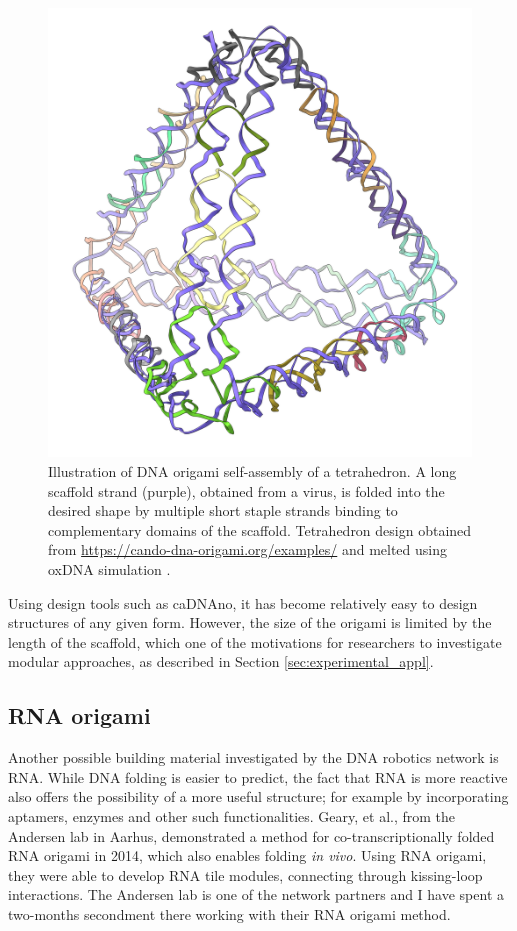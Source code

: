 \begin{figure}
    \centering\includegraphics[width=\textwidth/3]{figures/melt/assembled.png}
    \caption{Illustration of DNA origami self-assembly of a tetrahedron. A long scaffold strand (purple), obtained from a virus, is folded into the desired shape by multiple short staple strands binding to complementary domains of the scaffold. Tetrahedron design obtained from \url{https://cando-dna-origami.org/examples/} and melted using oxDNA simulation \cite{ouldridge2010dna}.
    }
    \label{fig:dnaOrigami}
\end{figure}

Using design tools such as caDNAno\cite{douglas2009rapid}, it has become relatively easy to design structures of any given form. However, the size of the origami is limited by the length of the scaffold, which one of the motivations for researchers to investigate modular approaches, as described in Section \ref{sec:experimental_appl}.

\subsection{RNA origami}

Another possible building material investigated by the DNA robotics network is RNA. While DNA folding is easier to predict, the fact that RNA is more reactive also offers the possibility of a more useful structure; for example by incorporating aptamers, enzymes and other such functionalities\cite{guo2010emerging}.
Geary, et al., from the Andersen lab in Aarhus, demonstrated a method\cite{geary2014single, sparvath2017computer} for co-transcriptionally folded RNA origami in 2014, which also enables folding \emph{in vivo}. Using RNA origami, they were able to develop RNA tile modules, connecting through kissing-loop interactions. The Andersen lab is one of the network partners and I have spent a two-months secondment there working with their RNA origami method.

